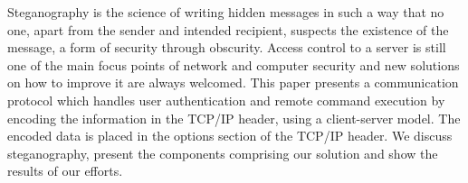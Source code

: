 Steganography is the science of writing hidden messages in such a way that no
one, apart from the sender and intended recipient, suspects the existence of
the message, a form of security through obscurity. Access control to a server
is still one of the main focus points of network and computer security and
new solutions on how to improve it are always welcomed. This paper presents
a communication protocol which handles user authentication and remote
command execution by encoding the information in the TCP/IP header, using a
client-server model. The encoded data is placed in the options section of the
TCP/IP header. We discuss steganography, present the components comprising our
solution and show the results of our efforts.
